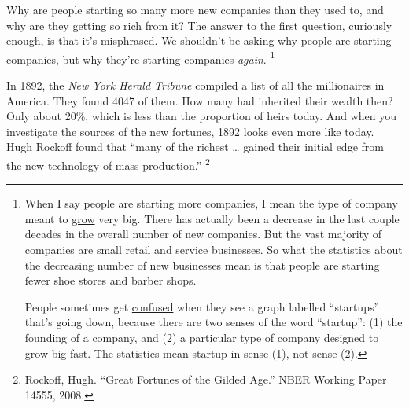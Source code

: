 Why are people starting so many more new companies than they used to,
and why are they getting so rich from it? The answer to the first
question, curiously enough, is that it's misphrased. We shouldn't be
asking why people are starting companies, but why they're starting
companies \emph{again}. \footnote{When I say people are starting more companies, I mean the type
of company meant to \href{growth.html}{grow} very big. There has
actually been a decrease in the last couple decades in the overall
number of new companies. But the vast majority of companies are small
retail and service businesses. So what the statistics about the
decreasing number of new businesses mean is that people are starting
fewer shoe stores and barber shops.

People sometimes get
\href{https://www.inc.com/magazine/201505/leigh-buchanan/the-vanishing-startups-in-decline.html}{confused}
when they see a graph labelled ``startups'' that's going down, because
there are two senses of the word ``startup'': (1) the founding of a
company, and (2) a particular type of company designed to grow big fast.
The statistics mean startup in sense (1), not sense (2).}

In 1892, the \emph{New York Herald Tribune} compiled a list of all the
millionaires in America. They found 4047 of them. How many had inherited
their wealth then? Only about 20\%, which is less than the proportion of
heirs today. And when you investigate the sources of the new fortunes,
1892 looks even more like today. Hugh Rockoff found that ``many of the
richest \ldots{} gained their initial edge from the new technology of
mass production.'' \footnote{Rockoff, Hugh. ``Great Fortunes of the Gilded Age.'' NBER
Working Paper 14555, 2008.}

